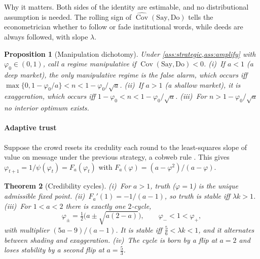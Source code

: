 \documentclass[10pt,twocolumn,letterpaper]{article}
\theoremstyle{plain}
\newtheorem{theorem}{Theorem}
\newtheorem{proposition}[theorem]{Proposition}
\theoremstyle{definition}
\theoremstyle{remark}
\DeclareMathOperator{\Cov}{Cov}
\begin{document}
\begin{takeaway}{Why it matters.}
Both sides of the identity are estimable, and no distributional assumption is needed. The rolling sign of $\widehat{\Cov}(\text{Say},\text{Do})$ tells the econometrician whether to follow or fade institutional words, while deeds are always followed, with slope $\lambda$.
\end{takeaway}

\begin{proposition}[Manipulation dichotomy]\label{prop:virality}
Under \cref{ass:strategic,ass:amplify} with $\varphi_0\in(0,1)$, call a regime manipulative if $\Cov(\text{Say},\text{Do})<0$. \textup{(i)}~If $a<1$ (a deep market), the only manipulative regime is the false alarm, which occurs iff $\max\{0,1-\varphi_0/a\}<n<1-\varphi_0/\sqrt a$. \textup{(ii)}~If $a>1$ (a shallow market), it is exaggeration, which occurs iff $1-\varphi_0<n<1-\varphi_0/\sqrt a$. \textup{(iii)}~For $n>1-\varphi_0/\sqrt a$ no interior optimum exists.
\end{proposition}

\paragraph{Adaptive trust} Suppose the crowd resets its credulity each round to the least-squares slope of value on message under the previous strategy, a cobweb rule \citep{ezekiel1938,evans2001}. This gives $\varphi_{t+1}=1/\psi(\varphi_t)=F_a(\varphi_t)$ with $F_a(\varphi)=(a-\varphi^2)/(a-\varphi)$.

\begin{theorem}[Credibility cycles]\label{thm:cycles}
\textup{(i)}~For $a>1$, truth ($\varphi=1$) is the unique admissible fixed point. \textup{(ii)}~$F_a'(1)=-1/(a-1)$, so truth is stable iff $\lambda k>1$. \textup{(iii)}~For $1<a<2$ there is exactly one $2$-cycle,
\[
  \varphi_\pm=\tfrac12\big(a\pm\sqrt{a(2-a)}\big),\qquad \varphi_-<1<\varphi_+,
\]
with multiplier $(5a-9)/(a-1)$. It is stable iff $\tfrac56<\lambda k<1$, and it alternates between shading and exaggeration. \textup{(iv)}~The cycle is born by a flip at $a=2$ and loses stability by a second flip at $a=\tfrac53$.
\end{theorem}
\end{document}

